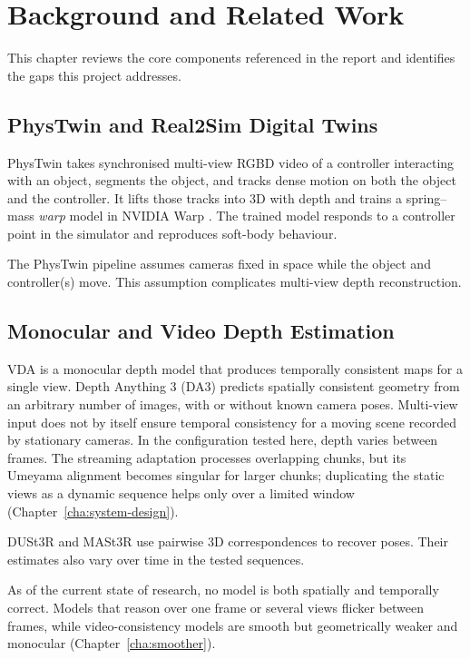 \chapter{Background and Related Work}
\label{cha:background}

This chapter reviews the core components referenced in the report and identifies the gaps this project addresses.

\section{PhysTwin and Real2Sim Digital Twins}
\label{sec:bg-phystwin}

PhysTwin \parencite{phystwin} takes synchronised multi-view RGBD video of a controller
interacting with an object, segments the object, and tracks dense motion on both the object and
the controller. It lifts those tracks into 3D with depth and trains a spring--mass \emph{warp}
model in NVIDIA Warp \parencite{warp}. The trained model responds to a controller point in the
simulator and reproduces soft-body behaviour.

The PhysTwin pipeline assumes cameras fixed in space while the object and controller(s) move. This assumption complicates multi-view depth reconstruction.

\section{Monocular and Video Depth Estimation}
\label{sec:bg-depth}

VDA \parencite{vda} is a monocular depth model that produces temporally consistent maps for a
single view. Depth Anything 3 (DA3) \parencite{da3} predicts spatially consistent geometry from an
arbitrary number of images, with or without known camera poses. Multi-view input does not by itself ensure
temporal consistency for a moving scene recorded by stationary cameras. In the configuration tested
here, depth varies between frames. The streaming adaptation processes overlapping chunks, but its
Umeyama alignment becomes singular for larger chunks; duplicating the static views as a dynamic
sequence helps only over a limited window (Chapter~\ref{cha:system-design}).

DUSt3R and MASt3R \parencite{dust3r,mast3r} use pairwise 3D correspondences to recover poses.
Their estimates also vary over time in the tested sequences.

As of the current state of research, no model is both spatially and temporally correct. Models that reason over one frame or several
views flicker between frames, while video-consistency models are smooth but geometrically weaker
and monocular (Chapter~\ref{cha:smoother}).

